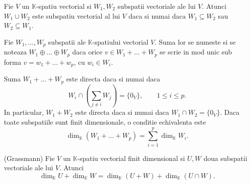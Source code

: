 \documentclass{article}
\begin{document}
\begin{enumerate}
  \propozitie Fie $V$ un $\mathbb{K}$-spatiu vectorial si $W_1, W_2$ subspatii vectoriale ale lui $V$. Atunci $W_1 \cup W_2$ este subspatiu vectorial al lui $V$ daca si numai daca $W_1 \subseteq W_2$ sau $W_2 \subseteq W_1$.

   Fie $W_1, \dots, W_p$ subspatii ale $\mathbb{K}$-spatiului vectorial $V$. Suma lor se numeste  si se noteaza $W_1 \oplus \dots \oplus W_p$ daca orice $v \in W_1 + \dots + W_p$ se scrie in mod unic sub forma $v=w_1+\dots+w_p$, cu $w_i \in W_i$.

  \lema Suma $W_1+\dots+W_p$ este directa daca si numai daca
  \[
    W_i \cap \left(\sum_{j\ne i} W_j\right)=\{0_V\}, \qquad 1\leq i\leq p.
  \]
  In particular, $W_1+W_2$ este directa daca si numai daca $W_1\cap W_2=\{0_V\}$. Daca toate subspatiile sunt finit dimensionale, o conditie echivalenta este
  \[
    \dim_{\mathbb K}(W_1+\dots+W_p)=\sum_{i=1}^p\dim_{\mathbb K}W_i.
  \]

  \begin{tcolorbox}
    \teorema (Grassmann) Fie $V$ un $\mathbb{K}$-spatiu vectorial finit dimensional si $U, W$ doua subspatii vectoriale ale lui $V$. Atunci
    \[
      \dim_{\mathbb{K}} U + \dim_{\mathbb{K}} W
      = \dim_{\mathbb{K}}(U + W) + \dim_{\mathbb{K}}(U \cap W).
    \]
  \end{tcolorbox}

\end{enumerate}
\end{document}
